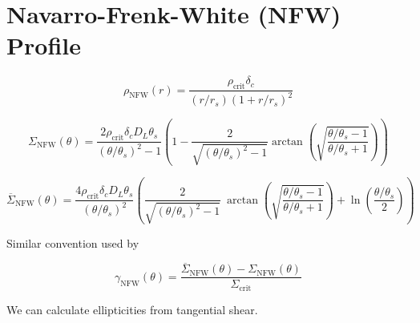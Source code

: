 \documentclass[10pt]{article}
\begin{document}
\section{Navarro-Frenk-White (NFW) Profile}

\begin{equation}
\rho_\mathrm{NFW}(r) = \frac{\rho_\mathrm{crit} \delta_c}{(r/r_s)\left(1 + r/r_s\right)^2}
\end{equation}


%
%
%

\begin{equation}
\Sigma_\mathrm{NFW}(\theta) = \frac{2 \rho_\mathrm{crit} \delta_c D_L \theta_s}{(\theta/\theta_s)^2 - 1} \left(1 - \frac{2}{\sqrt{(\theta/\theta_s)^2 - 1}} \arctan\left(\sqrt{\frac{\theta/\theta_s - 1}{\theta/\theta_s + 1}} \right) \right)
\end{equation}

\begin{equation}
\overline{\Sigma}_\mathrm{NFW}(\theta) = \frac{4 \rho_\mathrm{crit} \delta_c D_L \theta_s}{(\theta/\theta_s)^2} \left(
    \frac{2}{\sqrt{(\theta/\theta_s)^2 - 1}} ~\arctan\left(\sqrt{\frac{\theta/\theta_s - 1}{\theta/\theta_s + 1}} \right) + \ln{\left(\frac{\theta/\theta_s}{2}\right)}
\right)
\end{equation}

Similar convention used by \citet{Bartelmann2001}

\begin{equation}
\gamma_\mathrm{NFW}(\theta) = \frac{\overline{\Sigma}_\mathrm{NFW}(\theta) - \Sigma_\mathrm{NFW}(\theta)}{\Sigma_\mathrm{crit}}
\end{equation}

We can calculate ellipticities from tangential shear.
\end{document}
